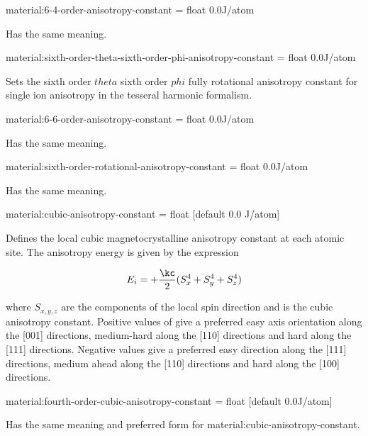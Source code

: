 {\zicf material:6-4-order-anisotropy-constant = float 0.0\newline J/atom} Has the same meaning.

{\zicf material:sixth-order-theta-sixth-order-phi-anisotropy-constant = float 0.0\newline J/atom} Sets the sixth order $theta$ sixth order $phi$ fully rotational anisotropy constant for single ion anisotropy in the tesseral harmonic formalism.

{\zicf material:6-6-order-anisotropy-constant = float 0.0\newline J/atom} Has the same meaning.

{\zicf material:sixth-order-rotational-anisotropy-constant = float 0.0\newline J/atom} Has the same meaning.

{\zicf material:cubic-anisotropy-constant = float [default 0.0 J/atom]}
Defines the local cubic magnetocrystalline anisotropy constant at each atomic site. The anisotropy energy is given by the expression

\begin{equation*}
E_i = +\frac{\kc}{2} (S_x^4 + S_y^4 + S_z^4)
\end{equation*}

\noindent where $S_{x,y,z}$ are the components of the local spin direction and \kc is the cubic anisotropy constant. Positive values of \kc give a preferred easy axis orientation along the [001] directions, medium-hard along the [110] directions and hard along the [111] directions. Negative values give a preferred easy direction along the [111] directions, medium ahead along the [110] directions and hard along the [100] directions.

{\zicf material:fourth-order-cubic-anisotropy-constant = float [default 0.0\newline J/atom]} Has the same meaning and preferred form for material:cubic-anisotropy-constant.

